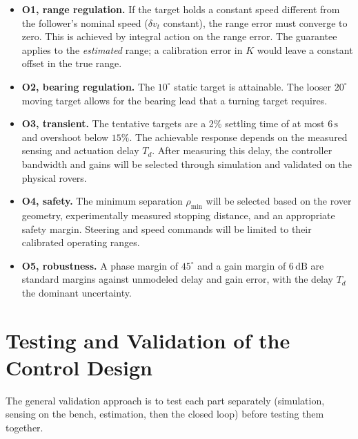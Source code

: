 \documentclass[journal,a4paper]{IEEEtran}
\begin{document}
\begin{itemize}
    \item \textbf{O1, range regulation.} If the target holds a constant speed
    different from the follower's nominal speed ($\delta v_t$ constant), the
    range error must converge to zero. This is achieved by integral action on
    the range error. The guarantee applies to the \emph{estimated} range; a
    calibration error in $K$ would leave a constant offset in the true range.
    \item \textbf{O2, bearing regulation.} The $10^\circ$ static target is attainable. The looser $20^\circ$ moving target allows for the bearing lead that a turning target requires.
    \item \textbf{O3, transient.} The tentative targets are a 2\% settling time of at most $6\,\mathrm{s}$ and overshoot below $15\%$. The achievable response depends on the measured sensing and actuation delay $T_d$. After measuring this delay, the controller bandwidth and gains will be selected through simulation and validated on the physical rovers.
    \item \textbf{O4, safety.} The minimum separation $\rho_{\min}$ will be selected based on the rover geometry, experimentally measured stopping distance, and an appropriate safety margin. Steering and speed commands will be limited to their calibrated operating ranges.
    \item \textbf{O5, robustness.} A phase margin of $45^\circ$ and a gain margin of $6\,\mathrm{dB}$ are standard margins against unmodeled delay and gain error, with the delay $T_d$ the dominant uncertainty.
\end{itemize}

\section{Testing and Validation of the Control Design}
\label{sec:valid}

The general validation approach is to test each part separately (simulation, sensing on the bench, estimation, then the closed loop) before testing them together.
\end{document}
